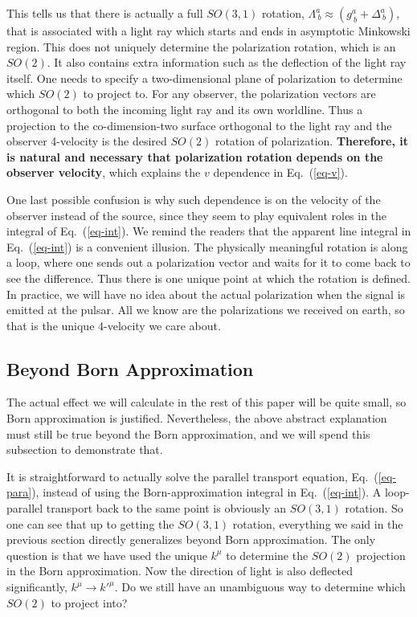 \documentclass[aps,showpacs,onecolumn,floats,prd,superscriptaddress,nofootinbib]{revtex4}
\begin{document}
This tells us that there is actually a full $SO(3,1)$ rotation, $\Lambda^a_{\ b}\approx\left(g^a_{\ b} + \Delta^a_{\ b}\right)$, that is associated with a light ray which starts and ends in asymptotic Minkowski region. 
This does not uniquely determine the polarization rotation, which is an $SO(2)$. 
It also contains extra information such as the deflection of the light ray itself. 
One needs to specify a two-dimensional plane of polarization to determine which $SO(2)$ to project to. 
For any observer, the polarization vectors are orthogonal to both the incoming light ray and its own worldline. 
Thus a projection to the co-dimension-two surface orthogonal to the light ray and the observer 4-velocity is the desired $SO(2)$ rotation of polarization. 
{\bf Therefore, it is natural and necessary that polarization rotation depends on the observer velocity}, which explains the $v$ dependence in Eq.~(\ref{eq-v}).

One last possible confusion is why such dependence is on the velocity of the observer instead of the source, since they seem to play equivalent roles in the integral of Eq.~(\ref{eq-int}). 
We remind the readers that the apparent line integral in Eq.~(\ref{eq-int}) is a convenient illusion. 
The physically meaningful rotation is along a loop, where one sends out a polarization vector and waits for it to come back to see the difference. 
Thus there is one unique point at which the rotation is defined. 
In practice, we will have no idea about the actual polarization when the signal is emitted at the pulsar. 
All we know are the polarizations we received on earth, so that is the unique 4-velocity we care about.

\subsection{Beyond Born Approximation}

The actual effect we will calculate in the rest of this paper will be quite small, so Born approximation is justified. 
Nevertheless, the above abstract explanation must still be true beyond the Born approximation, and we will spend this subsection to demonstrate that. 

It is straightforward to actually solve the parallel transport equation, Eq.~(\ref{eq-para}), instead of using the Born-approximation integral in Eq.~(\ref{eq-int}). 
A loop-parallel transport back to the same point is obviously an $SO(3,1)$ rotation.
So one can see that up to getting the $SO(3,1)$ rotation, everything we said in the previous section directly generalizes beyond Born approximation.
The only question is that we have used the unique $k^\mu$ to determine the $SO(2)$ projection in the Born approximation.
Now the direction of light is also deflected significantly, $k^\mu \rightarrow k'^\mu$. 
Do we still have an unambiguous way to determine which $SO(2)$ to project into?
\end{document}
